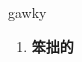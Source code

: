 
\begin{frame}
{\huge gawky}
\begin{center}
\begin{enumerate}\Large
  \item \textbf{笨拙的}
\end{enumerate}
\end{center}
\end{frame}

